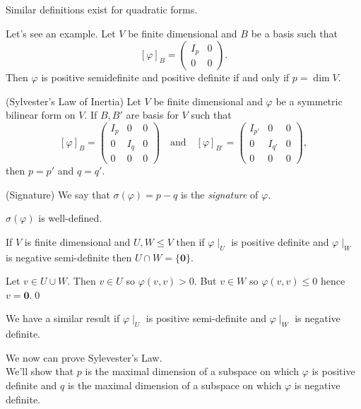 \documentclass{article}
\begin{document}
\begin{remark}
  Similar definitions exist for quadratic forms.
\end{remark}
Let's see an example. Let $ V $ be finite dimensional and $ B $ be a basis such that 
\[
	[\varphi]_B=\begin{pmatrix}
		I_p  & 0 \\
		0 & 0
	\end{pmatrix}.
\]
Then $ \varphi $ is positive semidefinite and positive definite if and only if $ p=\dim V $.
\begin{theorem}
(Sylvester's Law of Inertia) Let $ V $ be finite dimensional and $ \varphi $ be a symmetric bilinear form on $ V $. If $ B,B' $ are basis for $ V $ such that
\[
	[\varphi]_B=\begin{pmatrix}
		I_p & 0 & 0 \\
		0 & I_q & 0 \\
		0 & 0 & 0
	\end{pmatrix}\quad \text{and}\quad [\varphi]_{B'}=\begin{pmatrix}
	I_{p'} & 0 & 0 \\
	0 & I_{q'} & 0 \\
	0 & 0 & 0
	\end{pmatrix},
\]
then $ p=p' $ and $ q=q' $.
\end{theorem}
\begin{definition}
	(Signature) We say that $ \sigma(\varphi)=p-q $ is the \textit{signature} of $ \varphi $.
\end{definition}
\begin{corollary}
  $ \sigma(\varphi) $ is well-defined.
\end{corollary}
\begin{lemma}
  If $ V $ is finite dimensional and $ U,W\le V $ then if $ \varphi\mid_U $ is positive definite and $ \varphi\mid_W $ is negative semi-definite then $ U\cap W=\{\mathbf 0\} $.
\end{lemma}
\pf Let $ v\in U\cup W $. Then $ v\in U $ so $ \varphi(v,v)>0 $. But $ v\in W $ so $ \varphi(v,v)\le 0 $ hence $ v=\mathbf 0 $.\qed
\begin{remark}
  We have a similar result if $ \varphi\mid_U $ is positive semi-definite and $ \varphi\mid_W $ is negative definite.
\end{remark}
We now can prove Sylevester's Law.\\
\pf We'll show that $ p $ is the maximal dimension of a subspace on which $ \varphi $ is positive definite and $ q $ is the maximal dimension of a subspace on which $ \varphi $ is negative definite.\par
\end{document}
